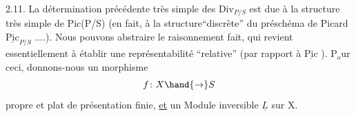 2.11. La détermination précédente très simple des $\mathrm{Div}_{P/S}$ est due à la
structure très simple de Pic(P/S) (en fait, à la structure``discrète'' du
préschéma de Picard $\underline{\mathrm{Pic}}_{P/S}$ ....). Nous pouvons abstraire le raisonnement
fait, qui revient essentiellement à établir une représentabilité ``relative''
(par rapport à $\underline{\mathrm{Pic}}$ ). P$_o$ur ceci, donnons-nous un morphisme
\[ f\colon X \hand{\to} S \]
propre et plat de présentation finie, \uline{et} un Module inversible $\underline{L}$ sur X.

